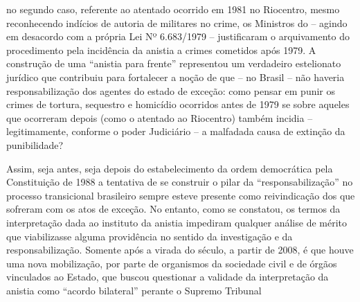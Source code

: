 no segundo caso, referente ao atentado ocorrido em 1981 no Riocentro,
mesmo reconhecendo indícios de autoria de militares no crime, os
Ministros do  -- agindo em desacordo com a própria Lei Nº 6.683/1979
-- justificaram o arquivamento do procedimento pela incidência da
anistia a crimes cometidos após 1979. A construção de uma ``anistia para
frente'' representou um verdadeiro estelionato jurídico que contribuiu
para fortalecer a noção de que -- no Brasil -- não haveria
responsabilização dos agentes do estado de exceção: como pensar em punir
os crimes de tortura, sequestro e homicídio ocorridos antes de 1979 se
sobre aqueles que ocorreram depois (como o atentado ao Riocentro) também
incidia -- legitimamente, conforme o poder Judiciário -- a malfadada
causa de extinção da punibilidade?

Assim, seja antes, seja depois do estabelecimento da ordem democrática
pela Constituição de 1988 a tentativa de se construir o pilar da
``responsabilização'' no processo transicional brasileiro sempre esteve
presente como reivindicação dos que sofreram com os atos de exceção. No
entanto, como se constatou, os termos da interpretação dada ao instituto
da anistia impediram qualquer análise de mérito que viabilizasse alguma
providência no sentido da investigação e da responsabilização. Somente
após a virada do século, a partir de 2008, é que houve uma nova
mobilização, por parte de organismos da sociedade civil e de órgãos
vinculados ao Estado, que buscou questionar a validade da interpretação
da anistia como ``acordo bilateral'' perante o Supremo Tribunal
